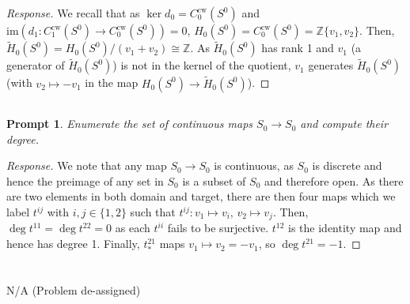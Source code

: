 \documentclass[english]{article}
\newcommand{\ZZ}{\mathbb{Z}}
\newcommand{\prob}[1]{\setcounter{section}{#1-1}\section{}}
\newcommand{\prt}[1]{\setcounter{subsection}{#1-1}\subsection{}}
\newtheorem*{prompt*}{Prompt}
\theoremstyle{remark}
\theoremstyle{definition}
\newcommand{\im}{\mathrm{im}}
\newcommand{\tH}{\tilde{H}}
\begin{document}
\begin{proof}[Response]
	We recall that as $\ker d_0=C^\mathrm{cw}_0(S^0)$ and $\im\left(d_1:C^\mathrm{cw}_1(S^0)\to C^{\mathrm{cw}}_0(S^0)\right)=0$, $H_0(S^0)=C_0^\mathrm{cw}(S^0)=\ZZ\{v_1,v_2\}$. Then, $\tH_0(S^0)=H_0(S^0)/(v_1+v_2)\cong \ZZ$. As $\tH_0(S^0)$ has rank 1 and $v_1$ (a generator of $\tH_0(S^0)$) is not in the kernel of the quotient, $v_1$ generates $\tH_0(S^0)$ (with $v_2\mapsto -v_1$ in the map $H_0(S^0)\to \tH_0(S^0)$). 
\end{proof}
\prt{2}\begin{prompt*}
	Enumerate the set of continuous maps $S_0\to S_0$ and compute their degree.
\end{prompt*}
\begin{proof}[Response]
	We note that any map $S_0\to S_0$ is continuous, as $S_0$ is discrete and hence the preimage of any set in $S_0$ is a subset of $S_0$ and therefore open. As there are two elements in both domain and target, there are then four maps which we label $t^{ij}$ with $i,j\in \{1,2\}$ such that $t^{ij}:v_1\mapsto v_i,\,v_2\mapsto v_j$. Then, $\deg t^{11}=\deg t^{22}=0$ as each $t^{ii}$ fails to be surjective. $t^{12}$ is the identity map and hence has degree 1. Finally, $t^{21}_*$ maps $v_1\mapsto v_2=-v_1$, so $\deg t^{21}=-1$.
\end{proof}
\prob{3}N/A (Problem de-assigned)
\end{document}
